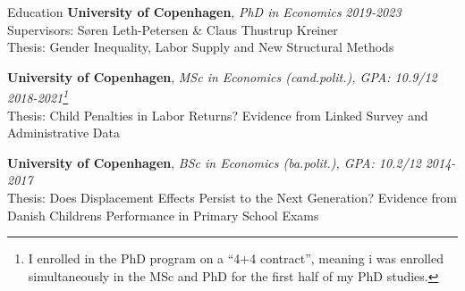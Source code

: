 \documentclass[
	10pt, %
]{resume} %
\begin{document}

\begin{rSection}{Education}
    \textbf{University of Copenhagen}, \textit{PhD in Economics} \hfill \textit{2019-2023} \\
    Supervisors: Søren Leth-Petersen \& Claus Thustrup Kreiner \\
    Thesis: {Gender Inequality, Labor Supply and New Structural Methods}

    \textbf{University of Copenhagen}, \textit{MSc in Economics (cand.polit.), GPA: 10.9/12} \hfill \textit{2018-2021\footnote{I enrolled in the PhD program on a ``4+4 contract'', meaning i was enrolled simultaneously in the MSc and PhD for the first half of my PhD studies.}} \\
    Thesis: {Child Penalties in Labor Returns? Evidence from Linked Survey and Administrative Data}

    \textbf{University of Copenhagen}, \textit{BSc in Economics (ba.polit.), GPA: 10.2/12} \hfill \textit{2014-2017} \\
    Thesis: {Does Displacement Effects Persist to the Next Generation? Evidence from Danish Childrens Performance in Primary School Exams}
\end{rSection}

\end{document}
